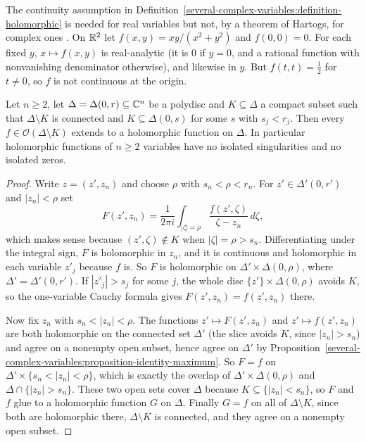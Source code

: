 \begin{counterexample}\label{several-complex-variables:counterexample-separate-real}
The continuity assumption in Definition~\ref{several-complex-variables:definition-holomorphic} is needed for real variables but not, by a theorem of Hartogs, for complex ones \cite{hormander-scv}. On $\mathbb{R}^2$ let
$f(x, y) = xy/(x^2 + y^2)$ and $f(0, 0) = 0$. For each fixed $y$, $x \mapsto f(x, y)$ is real-analytic (it is $0$ if $y = 0$, and a rational function with nonvanishing denominator otherwise), and likewise in $y$. But
$f(t, t) = \frac12$ for $t \neq 0$, so $f$ is not continuous at the origin.
\end{counterexample}

\begin{theorem}[Hartogs]\label{several-complex-variables:theorem-hartogs}
Let $n \geq 2$, let $\Delta = \Delta(0, r) \subseteq \mathbb{C}^n$ be a polydisc and $K \subseteq \Delta$ a compact subset such that $\Delta \setminus K$ is connected and $K \subseteq \Delta(0, s) $ for some
$s$ with $s_j < r_j$. Then every $f \in \mathcal{O}(\Delta \setminus K)$ extends to a holomorphic function on $\Delta$. In particular holomorphic functions of $n \geq 2$ variables have no isolated
singularities and no isolated zeros.
\end{theorem}

\begin{proof}
Write $z = (z', z_n)$ and choose $\rho$ with $s_n < \rho < r_n$. For $z' \in \Delta'(0, r')$ and $|z_n| < \rho$ set
\[
F(z', z_n) = \frac{1}{2\pi i}\int_{|\zeta| = \rho}\frac{f(z', \zeta)}{\zeta - z_n}\,d\zeta,
\]
which makes sense because $(z', \zeta) \notin K$ when $|\zeta| = \rho > s_n$. Differentiating under the integral sign, $F$ is holomorphic in $z_n$, and it is continuous and holomorphic in each variable
$z'_j$ because $f$ is. So $F$ is holomorphic on $\Delta' \times \Delta(0, \rho)$, where $\Delta' = \Delta'(0, r')$. If $|z'_j| > s_j$ for some $j$, the whole disc $\{z'\} \times \Delta(0, \rho)$ avoids $K$, so the one-variable
Cauchy formula gives $F(z', z_n) = f(z', z_n)$ there.

Now fix $z_n$ with $s_n < |z_n| < \rho$. The functions $z' \mapsto F(z', z_n)$ and $z' \mapsto f(z', z_n)$ are both holomorphic on the connected set $\Delta'$ (the slice avoids $K$, since $|z_n| > s_n$) and
agree on a nonempty open subset, hence agree on $\Delta'$ by Proposition~\ref{several-complex-variables:proposition-identity-maximum}. So $F = f$ on $\Delta' \times \{s_n < |z_n| < \rho\}$, which is exactly
the overlap of $\Delta' \times \Delta(0, \rho)$ and $\Delta \cap \{|z_n| > s_n\}$. These two open sets cover $\Delta$ because $K \subseteq \{|z_n| < s_n\}$, so $F$ and $f$ glue to a holomorphic function $G$
on $\Delta$. Finally $G = f$ on all of $\Delta \setminus K$, since both are holomorphic there, $\Delta \setminus K$ is connected, and they agree on a nonempty open subset.
\end{proof}

